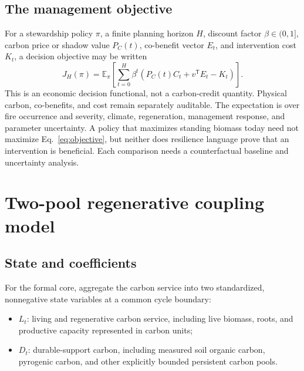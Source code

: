 \documentclass[10pt]{article}
\begin{document}
\subsection{The management objective}

For a stewardship policy $\pi$, a finite planning horizon $H$, discount factor
$\beta\in(0,1]$, carbon price or shadow value $P_C(t)$, co-benefit vector
$E_t$, and intervention cost $K_t$, a decision objective may be written
\begin{equation}
J_H(\pi)=\mathbb{E}_{\pi}\!\left[
\sum_{t=0}^{H}\beta^t\left(P_C(t)C_t+v^{\mathsf T}E_t-K_t\right)
\right].
\label{eq:objective}
\end{equation}
This is an economic decision functional, not a carbon-credit quantity.
Physical carbon, co-benefits, and cost remain separately auditable.  The
expectation is over fire occurrence and severity, climate, regeneration,
management response, and parameter uncertainty.  A policy that maximizes
standing biomass today need not maximize Eq.~\eqref{eq:objective}, but neither
does resilience language prove that an intervention is beneficial.  Each
comparison needs a counterfactual baseline and uncertainty analysis.

\section{Two-pool regenerative coupling model}

\subsection{State and coefficients}

For the formal core, aggregate the carbon service into two standardized,
nonnegative state variables at a common cycle boundary:

\begin{itemize}
\item $L_t$: living and regenerative carbon service, including live biomass,
roots, and productive capacity represented in carbon units;
\item $D_t$: durable-support carbon, including measured soil organic carbon,
pyrogenic carbon, and other explicitly bounded persistent carbon pools.
\end{itemize}
\end{document}
